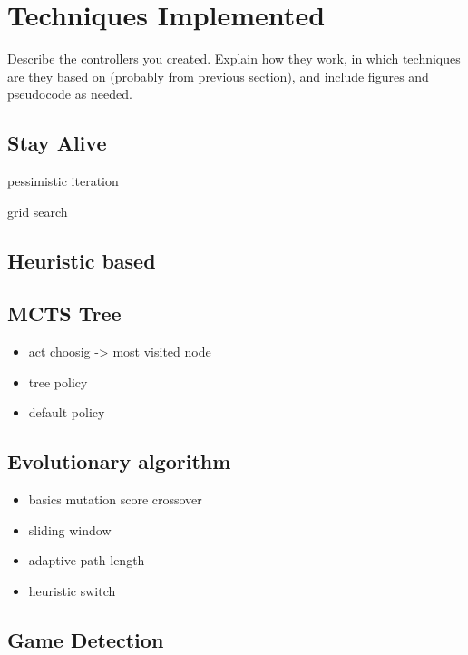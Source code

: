 \section{Techniques Implemented} \label{sec:exp}

Describe the controllers you created. Explain how they work, in which techniques are they based on (probably from previous section), and include figures and pseudocode as needed.


\subsection{Stay Alive} 

pessimistic iteration

grid search



\subsection{Heuristic based} 
 



\subsection{MCTS Tree} 

\begin{itemize}
  \item act choosig -> most visited node
  \item tree policy
  \item default policy
\end{itemize}



\subsection{Evolutionary algorithm} 

\begin{itemize}
  \item basics mutation score crossover
  \item sliding window
  \item adaptive path length
  \item heuristic switch
\end{itemize}
  
\subsection{Game Detection} 
  
